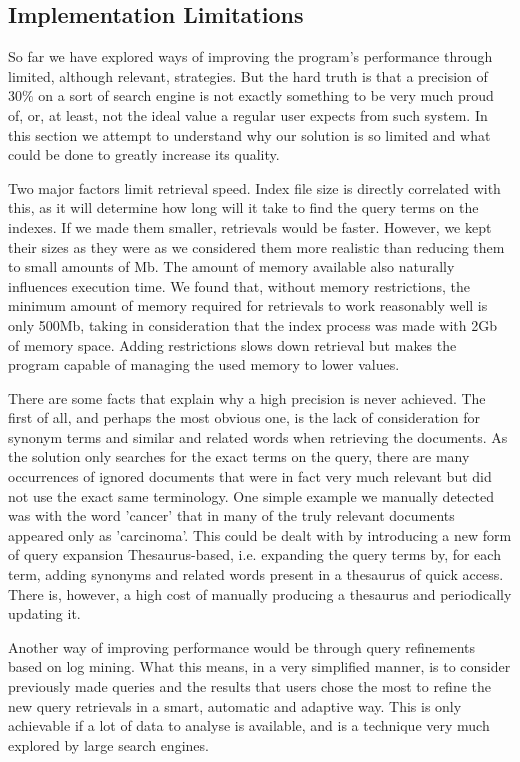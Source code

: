 \documentclass[12pt]{article}
\begin{document}
\subsection{Implementation Limitations} \label{limitations}

So far we have explored ways of improving the program's performance through
limited, although relevant, strategies.
But the hard truth is that a precision of 30\% on a sort of search engine is not
exactly something to be very much proud of, or, at least, not the ideal value 
a regular user expects from such system.
In this section we attempt to understand why our solution is so limited and 
what could be done to greatly increase its quality.

Two major factors limit retrieval speed.
Index file size is directly correlated with this, as it will determine how long
will it take to find the query terms on the indexes. 
If we made them smaller, retrievals would be faster.
However, we kept their sizes as they were as we considered them more realistic 
than reducing them to small amounts of Mb.
The amount of memory available also naturally influences execution time.
We found that, without memory restrictions, the minimum amount of memory required 
for retrievals to work reasonably well is only 500Mb, taking in consideration that the index process was made with 2Gb of memory space.
Adding restrictions slows down retrieval but makes the program capable of managing
the used memory to lower values.

There are some facts that explain why a high precision is never achieved.
The first of all, and perhaps the most obvious one, is the lack of consideration
for synonym terms and similar and related words when retrieving the documents.
As the solution only searches for the exact terms on the query, there are many
occurrences of ignored documents that were in fact very much relevant but did not
use the exact same terminology.
One simple example we manually detected was with the word 'cancer' that in many 
of the truly relevant documents appeared only as 'carcinoma'.
This could be dealt with by introducing a new form of query expansion Thesaurus-based,
i.e. expanding the query terms by, for each term, adding synonyms and related words
present in a thesaurus of quick access.
There is, however, a high cost of manually producing a thesaurus and periodically 
updating it.

Another way of improving performance would be through query refinements based on
log mining.
What this means, in a very simplified manner, is to consider previously made
queries and the results that users chose the most to refine the new query retrievals
in a smart, automatic and adaptive way.
This is only achievable if a lot of data to analyse is available, and is a technique
very much explored by large search engines.
\end{document}
